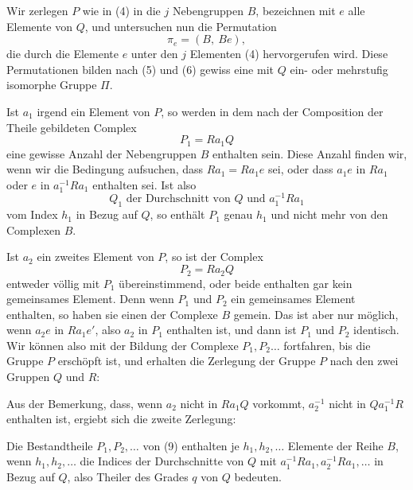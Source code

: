 Wir zerlegen $P$ wie in (4) in die $j$ Nebengruppen $B$, bezeichnen
mit $e$ alle Elemente von $Q$, und untersuchen nun die Permutation
\[
\pi_e = (B,\ Be),
\]
die durch die Elemente $e$ unter den $j$ Elementen (4) hervorgerufen
wird. Diese Permutationen bilden nach (5) und (6) gewiss eine
mit $Q$ ein- oder mehrstufig isomorphe Gruppe $\Pi$.

Ist $a_1$ irgend ein Element von $P$, so werden in dem nach
der Composition der Theile gebildeten Complex
\[
P_1 = Ra_1Q
\]
eine gewisse Anzahl der Nebengruppen $B$ enthalten sein. Diese
Anzahl finden wir, wenn wir die Bedingung aufsuchen, dass
$Ra_1 = Ra_1e$ sei, oder dass $a_1e$ in $Ra_1$ oder $e$ in $a_1^{-1}Ra_1$ enthalten
sei. Ist also
\[
Q_1 \text{ der Durchschnitt von } Q \text{ und } a_1^{-1}Ra_1
\]
vom Index $h_1$ in Bezug auf $Q$, so enthält $P_1$ genau $h_1$ und nicht
mehr von den Complexen $B$.

Ist $a_2$ ein zweites Element von $P$, so ist der Complex
\[
P_2 = Ra_2Q
\]
entweder völlig mit $P_1$ übereinstimmend, oder beide enthalten
gar kein gemeinsames Element. Denn wenn $P_1$ und $P_2$ ein
gemeinsames Element enthalten, so haben sie einen der Complexe $B$ gemein. Das ist aber nur möglich, wenn $a_2e$ in $Ra_1e'$,
also $a_2$ in $P_1$ enthalten ist, und dann ist $P_1$ und $P_2$ identisch.
Wir können also mit der Bildung der Complexe $P_1, P_2 \ldots$ fortfahren, bis die Gruppe $P$ erschöpft ist, und erhalten die Zerlegung der Gruppe $P$ nach den zwei Gruppen $Q$ und $R$:

Aus der Bemerkung, dass, wenn $a_2$ nicht in $Ra_1Q$ vorkommt,
$a_2^{-1}$ nicht in $Qa_1^{-1}R$ enthalten ist, ergiebt sich die zweite
Zerlegung:

Die Bestandtheile $P_1, P_2, \ldots$ von (9) enthalten je $h_1, h_2, \ldots$
Elemente der Reihe $B$, wenn $h_1, h_2, \ldots$ die Indices der Durchschnitte von $Q$ mit $a_1^{-1}Ra_1, a_2^{-1}Ra_1, \ldots$ in Bezug auf $Q$, also %
Theiler des Grades $q$ von $Q$ bedeuten.
